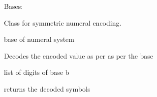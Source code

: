 \documentclass[letterpaper,10pt,english]{sphinxmanual}
\begin{document}
\begin{fulllineitems}
\label{\detokenize{symmetric_numeral:symmetric_numeral.SymmetricNumeral}}
\pysigstartsignatures
{}
\pysigstopsignatures
\sphinxAtStartPar
Bases: 

\sphinxAtStartPar
Class for symmetric numeral encoding.
\begin{description}
\begin{description}
\sphinxAtStartPar
base of numeral system

\end{description}

\end{description}

\begin{fulllineitems}
\label{\detokenize{symmetric_numeral:symmetric_numeral.SymmetricNumeral.decode}}
\pysigstartsignatures
{}
\pysigstopsignatures
\sphinxAtStartPar
Decodes the encoded value as per as per the base
\begin{description}
\begin{description}
\sphinxAtStartPar
list of digits of base b

\end{description}

\begin{description}
\sphinxAtStartPar
returns the decoded symbols

\end{description}

\end{description}

\begin{sphinxVerbatim}[commandchars=\\\{\}]
  
\end{sphinxVerbatim}


\end{fulllineitems}
\end{fulllineitems}
\end{document}
